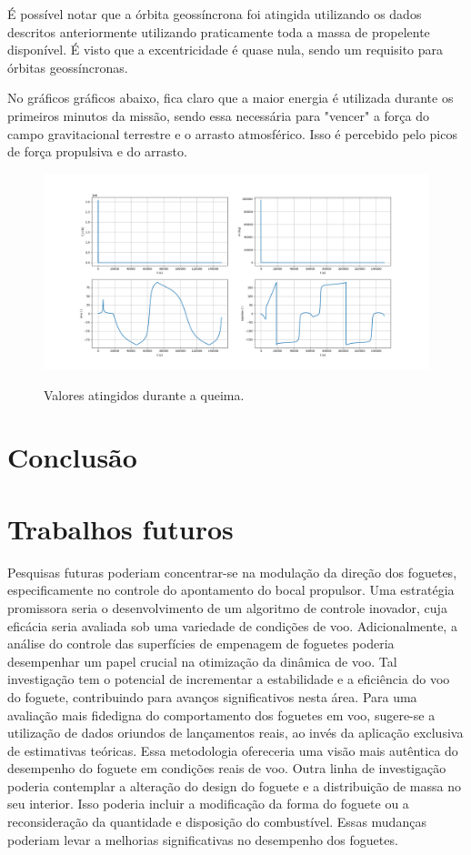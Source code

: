 É possível notar que a órbita geossíncrona foi atingida utilizando os dados descritos anteriormente utilizando praticamente toda a massa de propelente disponível. É visto que a excentricidade é quase nula, sendo um requisito para órbitas geossíncronas. 

\par No gráficos gráficos abaixo, fica claro que a maior energia é utilizada durante os primeiros minutos da missão, sendo essa necessária para "vencer" a força do campo gravitacional terrestre e o arrasto atmosférico. Isso é percebido pelo picos de força propulsiva e do arrasto. 
\begin{figure}[H]
    \begin{center}
        \caption{Valores atingidos durante a queima.}
        \includegraphics[width=6in]{figuras/Figure_3.png}
        \label{fig:3}
     \end{center}
\end{figure}


\chapter{Conclusão}

\chapter{Trabalhos futuros}

Pesquisas futuras poderiam concentrar-se na modulação da direção dos foguetes, especificamente no controle do apontamento do bocal propulsor. Uma estratégia promissora seria o desenvolvimento de um algoritmo de controle inovador, cuja eficácia seria avaliada sob uma variedade de condições de voo. Adicionalmente, a análise do controle das superfícies de empenagem de foguetes poderia desempenhar um papel crucial na otimização da dinâmica de voo. Tal investigação tem o potencial de incrementar a estabilidade e a eficiência do voo do foguete, contribuindo para avanços significativos nesta área. Para uma avaliação mais fidedigna do comportamento dos foguetes em voo, sugere-se a utilização de dados oriundos de lançamentos reais, ao invés da aplicação exclusiva de estimativas teóricas. Essa metodologia ofereceria uma visão mais autêntica do desempenho do foguete em condições reais de voo. Outra linha de investigação poderia contemplar a alteração do design do foguete e a distribuição de massa no seu interior. Isso poderia incluir a modificação da forma do foguete ou a reconsideração da quantidade e disposição do combustível. Essas mudanças poderiam levar a melhorias significativas no desempenho dos foguetes.